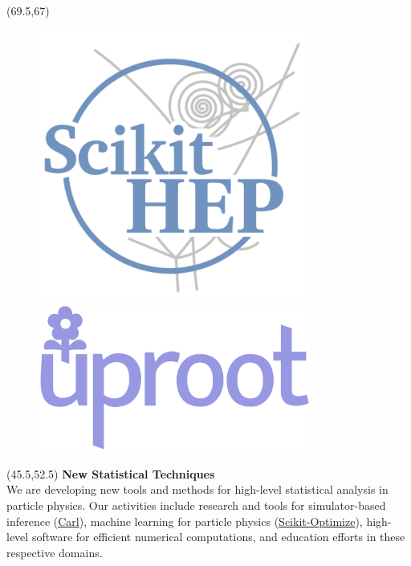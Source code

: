 \documentclass[final]{beamer}
\begin{document}
\begin{frame}{}
\begin{textblock}{12.0}(69.5,67)
\begin{figure}[tbph]
\centering
\includegraphics[width=0.8\textwidth]{images/scikit-hep-logo_800.png}

\vspace{1 cm}
\includegraphics[width=0.8\textwidth]{images/uproot-logo.pdf}
\end{figure}
\end{textblock}

\begin{textblock}{22.5}(45.5,52.5)
\textcolor{mybluelabel}{\bf New Statistical Techniques} \\
We are developing new tools and methods for
high-level statistical analysis in particle physics. Our activities
include research and tools for simulator-based inference (\href{http://diana-hep.org/carl/}{Carl}), machine
learning for particle physics (\href{https://scikit-optimize.github.io/}{Scikit-Optimize}), high-level software for efficient numerical
computations, and education efforts in these respective domains.
\end{textblock}


\end{frame}
\end{document}

